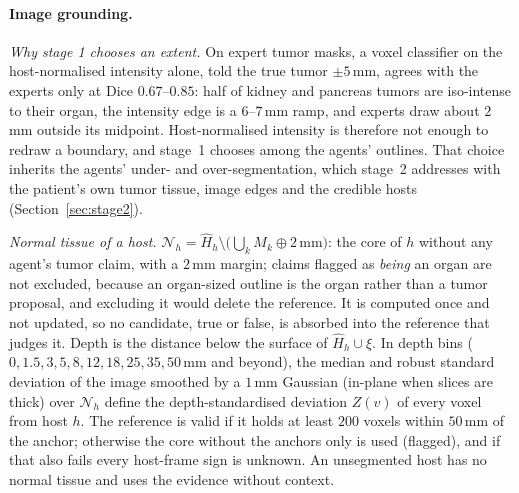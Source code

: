 \documentclass[fleqn,10pt]{olplainarticle}
\begin{document}
\paragraph{Image grounding.}
\label{sec:grounding_details}
\emph{Why stage 1 chooses an extent.} On expert tumor masks, a voxel classifier on the host-normalised intensity alone, told
the true tumor $\pm5$\,mm, agrees with the experts only at Dice $0.67$--$0.85$: half of kidney and pancreas tumors are
iso-intense to their organ, the intensity edge is a $6$--$7$\,mm ramp, and experts draw about $2$\,mm outside its midpoint.
Host-normalised intensity is therefore not enough to redraw a boundary, and stage~1 chooses among the agents' outlines.
That choice inherits the agents' under- and over-segmentation, which stage~2 addresses with the patient's own tumor tissue,
image edges and the credible hosts (Section~\ref{sec:stage2}).

\emph{Normal tissue of a host.} $\mathcal{N}_h=\hat H_h\setminus\bigl(\bigcup_k M_k\oplus2\,\mathrm{mm}\bigr)$: the core of
$h$ without any agent's tumor claim, with a $2$\,mm margin; claims flagged as \emph{being} an organ are not excluded, because an
organ-sized outline is the organ rather than a tumor proposal, and excluding it would delete the reference. It is computed once and not updated, so no candidate, true or
false, is absorbed into the reference that judges it. Depth is the distance below the surface of $\hat H_h\cup\xi$. In
depth bins ($0,1.5,3,5,8,12,18,25,35,50$\,mm and beyond), the median and robust standard deviation of the image smoothed by
a $1$\,mm Gaussian (in-plane when slices are thick) over $\mathcal{N}_h$ define the depth-standardised deviation $Z(v)$ of
every voxel from host $h$. The reference is valid if it holds at least $200$ voxels within $50$\,mm of the anchor; otherwise
the core without the anchors only is used (flagged), and if that also fails every host-frame sign is unknown. An
unsegmented host has no normal tissue and uses the evidence without context.
\end{document}
